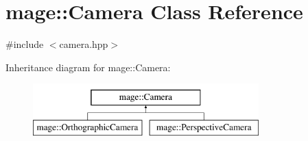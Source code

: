\hypertarget{classmage_1_1_camera}{}\section{mage\+:\+:Camera Class Reference}
\label{classmage_1_1_camera}


{\ttfamily \#include $<$camera.\+hpp$>$}

Inheritance diagram for mage\+:\+:Camera\+:\begin{figure}[H]
\begin{center}
\leavevmode
\includegraphics[height=2.000000cm]{classmage_1_1_camera}
\end{center}
\end{figure}
